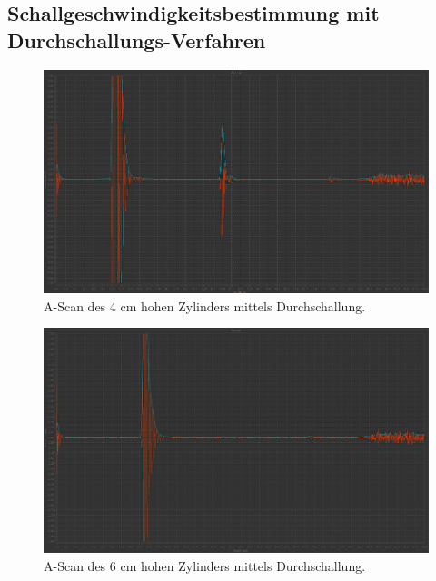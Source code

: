 \subsection{Schallgeschwindigkeitsbestimmung mit Durchschallungs-Verfahren}

    \begin{figure}
        \centering
        \includegraphics[width=15cm]{messwerte/Durchschallung/4_Durch.png}
        \caption{A-Scan des 4 cm hohen Zylinders mittels Durchschallung.}
    \end{figure}

    \begin{figure}
        \centering
        \includegraphics[width=15cm]{messwerte/Durchschallung/6_Durch.png}
        \caption{A-Scan des 6 cm hohen Zylinders mittels Durchschallung.}
    \end{figure}

